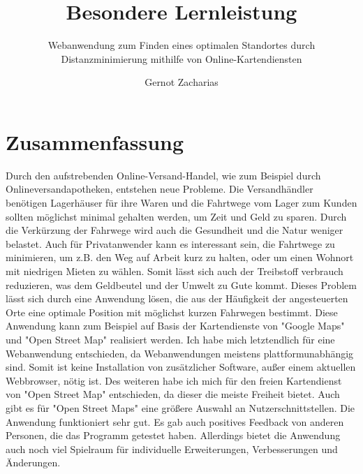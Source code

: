 \documentclass[a4paper, twoside, 12pt]{scrreprt}
\title{Besondere Lernleistung}
\author{Gernot Zacharias}
\subtitle{Webanwendung zum Finden eines optimalen Standortes durch Distanzminimierung mithilfe von Online-Kartendiensten}
\begin{document}
\maketitle
\cleardoublepage
\tableofcontents
\setcounter{page}{1}
\chapter*{Zusammenfassung}
Durch den aufstrebenden Online-Versand-Handel, wie zum Beispiel durch Onlineversandapotheken, entstehen neue Probleme. Die Versandhändler benötigen Lagerhäuser für ihre Waren und die Fahrtwege vom Lager zum Kunden sollten möglichst minimal gehalten werden, um Zeit und Geld zu sparen. Durch die Verkürzung der Fahrwege wird auch die Gesundheit und die Natur weniger belastet. Auch für Privatanwender kann es interessant sein, die Fahrtwege zu minimieren, um z.B. den Weg auf Arbeit kurz zu halten, oder um einen Wohnort mit niedrigen Mieten zu wählen. Somit lässt sich auch der Treibstoff verbrauch reduzieren, was dem Geldbeutel und der Umwelt zu Gute kommt. Dieses Problem lässt sich durch eine Anwendung lösen, die aus der Häufigkeit der angesteuerten Orte eine optimale Position mit möglichst kurzen Fahrwegen bestimmt. Diese Anwendung kann zum Beispiel auf Basis der Kartendienste von "Google Maps" und "Open Street Map" realisiert werden. Ich habe mich letztendlich für eine Webanwendung entschieden, da Webanwendungen meistens plattformunabhängig sind. Somit ist keine Installation von zusätzlicher Software, außer einem aktuellen Webbrowser, nötig ist. Des weiteren habe ich mich für den freien Kartendienst von "Open Street Map" entschieden, da dieser die meiste Freiheit bietet. Auch gibt es für "Open Street Maps" eine größere Auswahl an Nutzerschnittstellen. Die Anwendung funktioniert sehr gut. Es gab auch positives Feedback von anderen Personen, die das Programm getestet haben. Allerdings bietet die Anwendung auch noch viel Spielraum für individuelle Erweiterungen, Verbesserungen und Änderungen.
\end{document}
